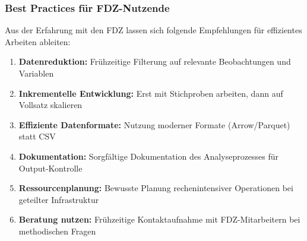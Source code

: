 \documentclass[
  ngerman,
  10pt,
  twocolumn]{article}
\providecommand{\tightlist}{%
  \setlength{\itemsep}{0pt}\setlength{\parskip}{0pt}}
\begin{document}
\subsubsection{Best Practices für
FDZ-Nutzende}\label{best-practices-fuxfcr-fdz-nutzende}

Aus der Erfahrung mit den FDZ lassen sich folgende Empfehlungen für
effizientes Arbeiten ableiten:

\begin{enumerate}
\def\labelenumi{\arabic{enumi}.}
\tightlist
\item
  \textbf{Datenreduktion:} Frühzeitige Filterung auf relevante
  Beobachtungen und Variablen
\item
  \textbf{Inkrementelle Entwicklung:} Erst mit Stichproben arbeiten,
  dann auf Vollsatz skalieren
\item
  \textbf{Effiziente Datenformate:} Nutzung moderner Formate
  (Arrow/Parquet) statt CSV
\item
  \textbf{Dokumentation:} Sorgfältige Dokumentation des Analyseprozesses
  für Output-Kontrolle
\item
  \textbf{Ressourcenplanung:} Bewusste Planung rechenintensiver
  Operationen bei geteilter Infrastruktur
\item
  \textbf{Beratung nutzen:} Frühzeitige Kontaktaufnahme mit
  FDZ-Mitarbeitern bei methodischen Fragen
\end{enumerate}


\printbibliography
\end{document}
